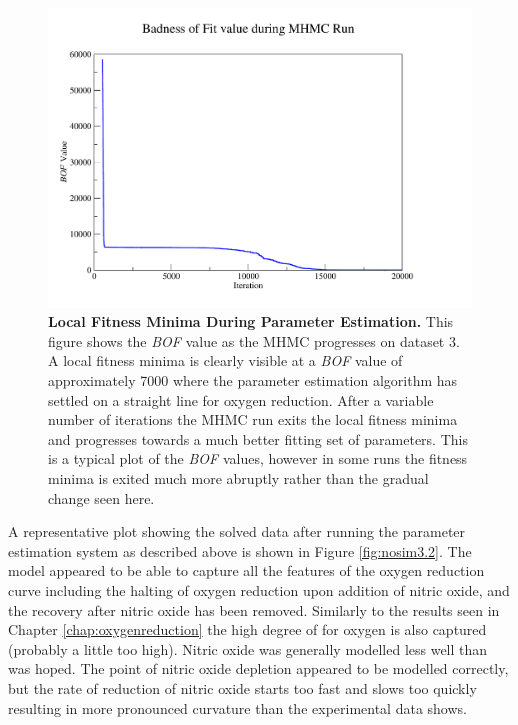 \begin{figure}[tbp]
 \centering
 \includegraphics[width=15cm, trim=1cm 1cm 3cm 1cm, clip=true]{./06-noreduction/data/ds3-bof.pdf}
 \caption[{Local Fitness Minima During Parameter Estimation.}]{{\bf Local Fitness Minima During Parameter Estimation.} This figure shows the \textit{BOF} value as the MHMC progresses on dataset 3. A local fitness minima is clearly visible at a \textit{BOF} value of approximately 7000 where the parameter estimation algorithm has settled on a straight line for oxygen reduction. After a variable number of iterations the MHMC run exits the local fitness minima and progresses towards a much better fitting set of parameters. This is a typical plot of the \textit{BOF} values, however in some runs the fitness minima is exited much more abruptly rather than the gradual change seen here.}
 \label{fig:nosim3-bof}
\end{figure}

A representative plot showing the solved data after running the parameter estimation system as described above is shown in Figure \ref{fig:nosim3.2}. The model appeared to be able to capture all the features of the oxygen reduction curve including the halting of oxygen reduction upon addition of nitric oxide, and the recovery after nitric oxide has been removed. Similarly to the results seen in Chapter \ref{chap:oxygenreduction} the high degree of \cbbthree{} for oxygen is also captured (probably a little too high). Nitric oxide was generally modelled less well than was hoped. The point of nitric oxide depletion appeared to be modelled correctly, but the rate of reduction of nitric oxide starts too fast and slows too quickly resulting in more pronounced curvature than the experimental data shows.

